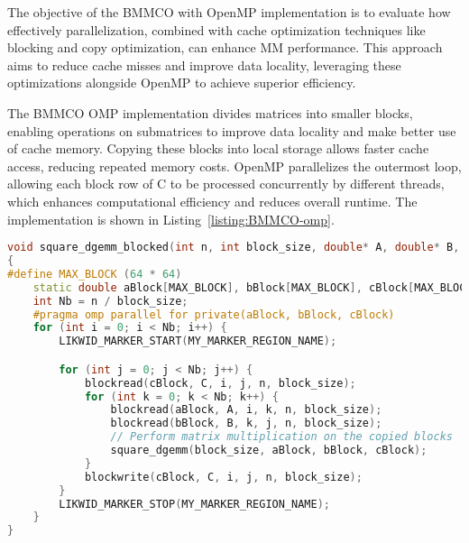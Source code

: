 The objective of the BMMCO with OpenMP implementation is to evaluate how effectively parallelization, combined with cache optimization techniques like blocking and copy optimization, can enhance MM performance. This approach aims to reduce cache misses and improve data locality, leveraging these optimizations alongside OpenMP to achieve superior efficiency.

The BMMCO OMP implementation divides matrices into smaller blocks, enabling operations on submatrices to improve data locality and make better use of cache memory. Copying these blocks into local storage allows faster cache access, reducing repeated memory costs. OpenMP parallelizes the outermost loop, allowing each block row of C to be processed concurrently by different threads, which enhances computational efficiency and reduces overall runtime. The implementation is shown in Listing~\ref{listing:BMMCO-omp}.

\begin{lstlisting}[caption={\textbf{BMMCO with OpenMP implementation of MM using blocking and copy optimization techniques.} The implementation divides the matrices into smaller sub-blocks to improve data locality and minimize cache misses. OpenMP is used to parallelize the outermost loop, allowing each block row to be processed concurrently by different threads. Copying matrix blocks into local storage (faster cache) prior to performing computations helps reduce memory latency by taking advantage of the CPU cache, rather than accessing global memory repeatedly. LIKWID markers are included to measure the performance of the parallelized block operations, focusing specifically on the parallel region of the MM.},label={listing:BMMCO-omp}, name=BMMCO-omp, float=htbp, style=mystyle, language=C++]
void square_dgemm_blocked(int n, int block_size, double* A, double* B, double* C)
{
#define MAX_BLOCK (64 * 64)
    static double aBlock[MAX_BLOCK], bBlock[MAX_BLOCK], cBlock[MAX_BLOCK];
    int Nb = n / block_size;
    #pragma omp parallel for private(aBlock, bBlock, cBlock)
    for (int i = 0; i < Nb; i++) {
        LIKWID_MARKER_START(MY_MARKER_REGION_NAME);

        for (int j = 0; j < Nb; j++) {
            blockread(cBlock, C, i, j, n, block_size);
            for (int k = 0; k < Nb; k++) {
                blockread(aBlock, A, i, k, n, block_size);
                blockread(bBlock, B, k, j, n, block_size);
                // Perform matrix multiplication on the copied blocks
                square_dgemm(block_size, aBlock, bBlock, cBlock);
            }
            blockwrite(cBlock, C, i, j, n, block_size);
        }
        LIKWID_MARKER_STOP(MY_MARKER_REGION_NAME);
    }
}
\end{lstlisting}

